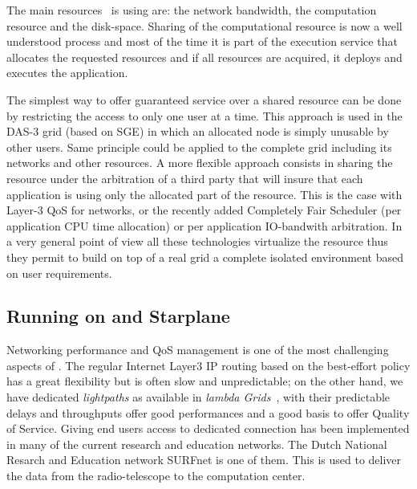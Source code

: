 The main resources \scarie\ is using are: the network bandwidth, the
computation resource and the disk-space. Sharing of the computational
resource is now a well understood process and most of the time it is
part of the execution service that allocates the requested resources
and if all resources are acquired, it deploys and executes the
application.

The simplest way to offer guaranteed service over a shared resource
can be done by restricting the access to only one user at a time. This
approach is used in the DAS-3 grid (based on SGE) in which an
allocated node is simply unusable by other users. Same principle could
be applied to the complete grid including its networks and other
resources. A more flexible approach consists in sharing the resource
under the arbitration of a third party that will insure that each
application is using only the allocated part of the resource. This is
the case with Layer-3 QoS for networks, or the recently added
Completely Fair Scheduler (per application CPU time allocation) or per
application IO-bandwith arbitration\cite{}. In
a very general point of view all these technologies virtualize the
resource thus they permit to build on top of a real grid a complete
isolated environment based on user requirements.

\subsection{Running \scarie on  and Starplane}
Networking performance and QoS management is one of the most
challenging aspects of \scarie.  The regular Internet Layer3 IP
routing based on the best-effort policy has a great flexibility but is
often slow and unpredictable; on the other hand, we have dedicated
\textit{lightpaths} as available in \textit{lambda
  Grids}~\cite{eslea-2007}, with their predictable
delays and throughputs offer good performances and a good basis to
offer Quality of Service. Giving end users access to dedicated
connection has been implemented in many of the current research and
education networks. The Dutch National Resarch and Education network
SURFnet is one of them.  This is used to deliver the data from the
radio-telescope to the computation center.

